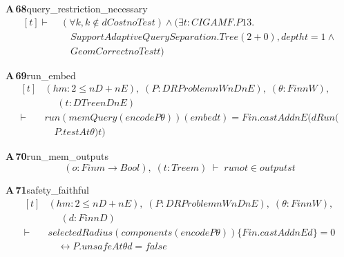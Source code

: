 \documentclass[conference]{IEEEtran}
\theoremstyle{definition}
\newcommand{\lean}[1]{\textsf{\footnotesize #1}}
\begin{document}
\noindent\textbf{A\,68}\quad\lean{query\_restriction\_necessary}
{\footnotesize\[ \begin{aligned}[t]
\vdash\;&(\forall \mathit{k}, \mathit{k} \notin \mathit{dCost} \mathit{noTest}) \wedge (\exists \mathit{t} : \mathit{CIGAMF}.\mathit{P13}.\\
&\quad \mathit{SupportAdaptiveQuerySeparation}.\mathit{Tree} (2 + 0), \mathit{depth} \mathit{t} = 1 \wedge\\
&\quad \mathit{GeomCorrect} \mathit{noTest} \mathit{t})
\end{aligned} \]}

\noindent\textbf{A\,69}\quad\lean{run\_embed}
{\footnotesize\[ \begin{aligned}[t]
&(\mathit{hm} : 2 \leq \mathit{nD} + \mathit{nE}),\; (\mathit{P} : \mathit{DRProblem} \mathit{nW} \mathit{nD} \mathit{nE}),\; (\theta : \mathit{Fin} \mathit{nW}),\\
&\quad \; (\mathit{t} : \mathit{DTree} \mathit{nD} \mathit{nE})\\
\vdash\;&\mathit{run} (\mathit{memQuery} (\mathit{encode} \mathit{P} \theta )) (\mathit{embed} \mathit{t}) = \mathit{Fin}.\mathit{castAdd} \mathit{nE} (\mathit{dRun} (\\
&\quad \mathit{P}.\mathit{testAt} \theta ) \mathit{t})
\end{aligned} \]}

\noindent\textbf{A\,70}\quad\lean{run\_mem\_outputs}
{\footnotesize\[ (\mathit{o} : \mathit{Fin} \mathit{m} \to \mathit{Bool}),\; (\mathit{t} : \mathit{Tree} \mathit{m}) \;\vdash\; \mathit{run} \mathit{o} \mathit{t} \in \mathit{outputs} \mathit{t} \]}

\noindent\textbf{A\,71}\quad\lean{safety\_faithful}
{\footnotesize\[ \begin{aligned}[t]
&(\mathit{hm} : 2 \leq \mathit{nD} + \mathit{nE}),\; (\mathit{P} : \mathit{DRProblem} \mathit{nW} \mathit{nD} \mathit{nE}),\; (\theta : \mathit{Fin} \mathit{nW}),\\
&\quad \; (\mathit{d} : \mathit{Fin} \mathit{nD})\\
\vdash\;&\mathit{selectedRadius} (\mathit{components} (\mathit{encode} \mathit{P} \theta )) \{ \mathit{Fin}.\mathit{castAdd} \mathit{nE} \mathit{d}\} = 0\\
&\quad \leftrightarrow \mathit{P}.\mathit{unsafeAt} \theta \mathit{d} = \mathit{false}
\end{aligned} \]}
\end{document}
